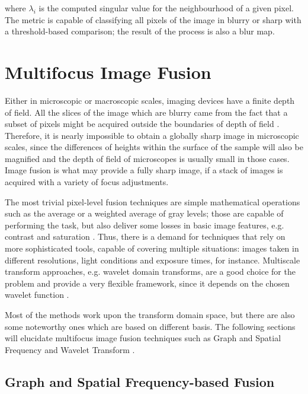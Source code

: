 \noindent where $\lambda_{i}$ is the computed singular value for the neighbourhood of a given pixel. The metric is capable of classifying all pixels of the image in blurry or sharp with a threshold-based comparison; the result of the process is also a blur map.


\section{Multifocus Image Fusion}
\label{sec:multifocus_image_fusion}

Either in microscopic or macroscopic scales, imaging devices have a finite depth of field. All the slices of the image which are blurry came from the fact that a subset of pixels might be acquired outside the boundaries of depth of field \cite{huang2007evaluation}. Therefore, it is nearly impossible to obtain a globally sharp image in microscopic scales, since the differences of heights within the surface of the sample will also be magnified and the depth of field of microscopes is usually small in those cases. Image fusion is what may provide a fully sharp image, if a stack of images is acquired with a variety of focus adjustments.

The most trivial pixel-level fusion techniques are simple mathematical operations such as the average or a weighted average of gray levels; those are capable of performing the task, but also deliver some losses in basic image features, e.g. contrast and saturation \cite{zhang2009multifocus}. Thus, there is a demand for techniques that rely on more sophisticated tools, capable of covering multiple situations: images taken in different resolutions, light conditions and exposure times, for instance. Multiscale transform approaches, e.g. wavelet domain transforms, are a good choice for the problem and provide a very flexible framework, since it depends on the chosen wavelet function \cite{pajares2004wavelet}.

Most of the methods work upon the transform domain space, but there are also some noteworthy ones which are based on different basis. The following sections will elucidate multifocus image fusion techniques such as Graph and Spatial Frequency \cite{li2008multifocus} and Wavelet Transform \cite{pajares2004wavelet}.


\subsection{Graph and Spatial Frequency-based Fusion}

